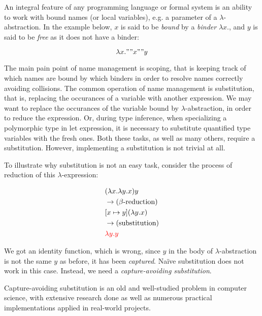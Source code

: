 \section{}

An integral feature of any programming language or formal system is an ability to work with bound names (or local variables), e.g. a parameter of a $\lambda$-abstraction. In the example below, $x$ is said to be \textit{bound} by a \textit{binder} $\lambda x.$, and $y$ is said to be \textit{free} as it does not have a binder:

$$
\lambda x." "x" "y
$$

The main pain point of name management is scoping, that is keeping track of which names are bound by which binders in order to resolve names correctly avoiding collisions. The common operation of name management is substitution, that is, replacing the occurances of a variable with another expression. We may want to replace the occurances of the variable bound by $\lambda$-abstraction, in order to reduce the expression. Or, during type inference, when specializing a polymorphic type in let expression, it is necessary to substitute quantified type variables with the fresh ones. Both these tasks, as well as many others, require a substitution. However, implementing a substitution is not trivial at all.

To illustrate why substitution is not an easy task, consider the process of reduction of this $\lambda$-expression:

\begin{align*}
  & (\lambda x. \lambda y. x) y \\
  & \rightarrow \text{($\beta$-reduction)} \\
  & [x \mapsto y](\lambda y. x) \\
  & \rightarrow \text{(substitution)} \\
  & \textcolor{red}{\lambda y. y}
\end{align*}

We got an identity function, which is wrong, since $y$ in the body of $\lambda$-abstraction is not the same $y$ as before, it has been \textit{captured}. Naïve substitution does not work in this case. Instead, we need a \textit{capture-avoiding substitution}.

Capture-avoiding substitution is an old and well-studied problem in computer science, with extensive research done as well as numerous practical implementations applied in real-world projects.

